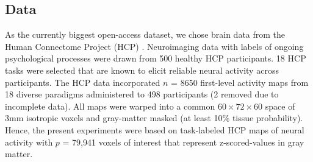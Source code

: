 \documentclass{article}
\begin{document}
%
\subsection{Data}
As the currently biggest open-access dataset,
we chose brain data from the Human Connectome Project (HCP)
\cite{barch2013}.
Neuroimaging data with labels of ongoing psychological processes
were drawn from 500
healthy HCP participants.
18 HCP tasks 
were selected that are known to elicit reliable neural activity
across participants.
The HCP data incorporated $n$ = 8650 first-level activity maps
from 18 diverse paradigms administered to 498 participants (2 removed
due to incomplete data).
All maps were warped into a common $60\times72\times60$ space of
3mm isotropic voxels and gray-matter masked (at least 10\% tissue
probability).
Hence,
the present experiments were based on task-labeled HCP maps of neural
activity with
$p$ = 79,941 voxels of interest that represent z-scored-values in gray matter.
\end{document}
